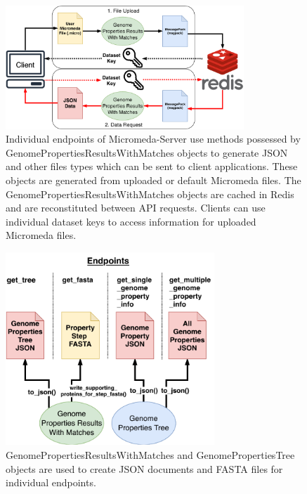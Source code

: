 \begin{figure}[!ht]
  \centering
	\includegraphics[width=0.80\textwidth]{media/Micromeda-Server-Workflow.pdf}
	 \caption{Individual endpoints of Micromeda-Server use methods possessed by GenomePropertiesResultsWithMatches objects to generate JSON and other files types which can be sent to client applications. These objects are generated from uploaded or default Micromeda files. The GenomePropertiesResultsWithMatches objects are cached in Redis and are reconstituted between API requests. Clients can use individual dataset keys to access information for uploaded Micromeda files.}
	 \label{fig:micromeda-server-workflow}
\end{figure}

\begin{figure}[!ht]
  \centering
	\includegraphics[width=0.70\textwidth]{media/Micromeda-Endpoints.pdf}
	 \caption{GenomePropertiesResultsWithMatches and GenomePropertiesTree objects are used to create JSON documents and FASTA files for individual endpoints.}
	 \label{fig:micromeda-endpoints}
\end{figure}

